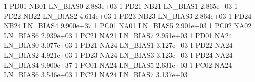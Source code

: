 1 PD01 NB01 LN_BIAS0 2.883e+03 
1 PD21 NB21 LN_BIAS1 2.865e+03 
1 PD22 NB22 LN_BIAS2 4.614e+03 
1 PD23 NB23 LN_BIAS3 2.864e+03 
1 PD24 NB24 LN_BIAS4 9.900e+37 
1 PC01 NA01 LN_BIAS5 2.901e+03 
1 PC02 NA02 LN_BIAS6 2.939e+03 
1 PC21 NA21 LN_BIAS7 2.951e+03 
1 PD01 NA24 LN_BIAS0 3.077e+03 
1 PD21 NA24 LN_BIAS1 3.127e+03 
1 PD22 NA24 LN_BIAS2 4.921e+03 
1 PD23 NA24 LN_BIAS3 3.123e+03 
1 PD24 NA24 LN_BIAS4 9.900e+37 
1 PC01 NA24 LN_BIAS5 2.631e+03 
1 PC02 NA24 LN_BIAS6 3.546e+03 
1 PC21 NA24 LN_BIAS7 3.137e+03 
